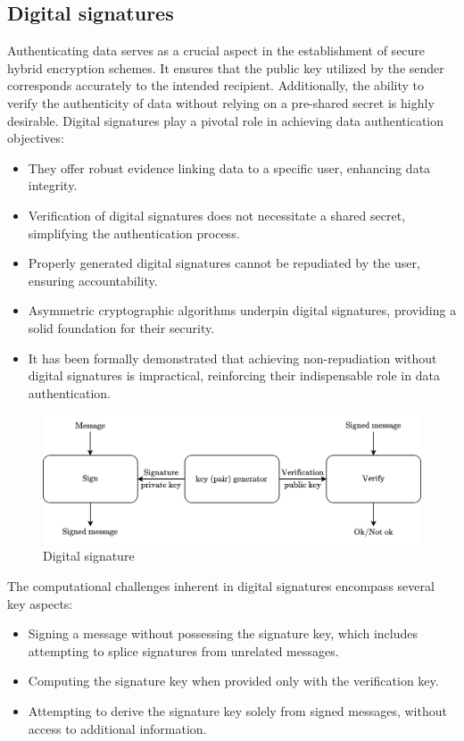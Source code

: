 \subsection{Digital signatures}
Authenticating data serves as a crucial aspect in the establishment of secure hybrid encryption schemes. 
It ensures that the public key utilized by the sender corresponds accurately to the intended recipient. 
Additionally, the ability to verify the authenticity of data without relying on a pre-shared secret is highly desirable.
Digital signatures play a pivotal role in achieving data authentication objectives:
\begin{itemize}
    \item They offer robust evidence linking data to a specific user, enhancing data integrity.
    \item Verification of digital signatures does not necessitate a shared secret, simplifying the authentication process.
    \item Properly generated digital signatures cannot be repudiated by the user, ensuring accountability.
    \item Asymmetric cryptographic algorithms underpin digital signatures, providing a solid foundation for their security.
    \item It has been formally demonstrated that achieving non-repudiation without digital signatures is impractical, reinforcing their indispensable role in data authentication.
\end{itemize}
\begin{figure}[H]
    \centering
    \includegraphics[width=0.75\linewidth]{images/aut.png}
    \caption{Digital signature}
\end{figure}
The computational challenges inherent in digital signatures encompass several key aspects:
\begin{itemize}
    \item Signing a message without possessing the signature key, which includes attempting to splice signatures from unrelated messages.
    \item Computing the signature key when provided only with the verification key.
    \item Attempting to derive the signature key solely from signed messages, without access to additional information.
\end{itemize}

